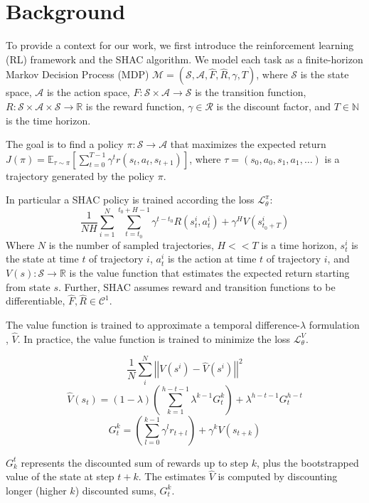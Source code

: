 \section{Background}

To provide a context for our work, we first introduce the reinforcement learning (RL) framework and the SHAC algorithm. We model each task as a finite-horizon Markov Decision Process (MDP) $\mathcal{M} = (\mathcal{S}, \mathcal{A}, \hat{F}, \hat{R}, \gamma, T)$, where $\mathcal{S}$ is the state space, $\mathcal{A}$ is the action space, $F:\mathcal{S}\times\mathcal{A}\rightarrow\mathcal{S}$ is the transition function, $R:\mathcal{S}\times\mathcal{A}\times\mathcal{S}\rightarrow\mathbb{R}$ is the reward function, $\gamma\in\mathcal{R}$ is the discount factor, and $T\in\mathbb{N}$ is the time horizon. 

The goal is to find a policy $\pi:\mathcal{S}\rightarrow\mathcal{A}$ that maximizes the expected return $J(\pi) = \mathbb{E}_{\tau\sim\pi}\left[\sum_{t=0}^{T-1}\gamma^t r(s_t, a_t, s_{t+1})\right]$, where $\tau = (s_0, a_0, s_1, a_1, \ldots)$ is a trajectory generated by the policy $\pi$.

In particular a SHAC policy is trained according the loss $\mathcal{L}_\theta^{\pi}$: 
$$ \frac{1}{NH}\sum_{i=1}^N \sum_{t=t_0}^{t_0+H-1} \gamma^{t-t_0} R(s_t^i, a_t^i) + \gamma^H V(s^i_{t_0+T})$$
Where $N$ is the number of sampled trajectories, $H << T$ is a time horizon, $s_t^i$ is the state at time $t$ of trajectory $i$, $a_t^i$ is the action at time $t$ of trajectory $i$, and $V(s):\mathcal{S}\rightarrow\mathbb{R}$ is the value function that estimates the expected return starting from state $s$. Further, SHAC assumes reward and transition functions to be differentiable, $\hat{F},\hat{R} \in \mathcal{C}^1$.

The value function is trained to approximate a temporal difference-$\lambda$ formulation \cite{Sutton98}, $\hat{V}$. In practice, the value function is trained to minimize the loss $\mathcal{L}_\theta^{V}$.

$$ \frac{1}{N}\sum_i^N\left|\left| V(s^i) - \hat{V}(s^i) \right|\right|^2 $$
$$ \hat{V}(s_t) = (1-\lambda) \left(\sum_{k=1}^{h-t-1}\lambda^{k-1}G_t^k\right) + \lambda^{h-t-1}G_t^{h-t}$$
$$ G_t^k = \left(\sum_{l=0}^{k-1}\gamma^l r_{t+l}\right) + \gamma^k V(s_{t+k})$$

$G^t_k$ represents the discounted sum of rewards up to step $k$, plus the bootstrapped value of the state at step $t+k$. The estimates $\hat{V}$ is computed by discounting longer (higher $k$) discounted sums, $G^k_t$.
